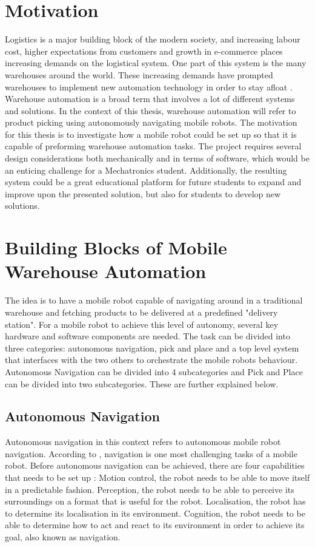 \section{Motivation}
Logistics is a major building block of the modern society, and increasing labour cost, higher expectations from customers and growth in e-commerce places increasing demands on the logistical system. One part of this system is the many warehouses around the world. These increasing demands have prompted warehouses to implement new automation technology in order to stay afloat \cite{CaiKai2020Wabl}. Warehouse automation is a broad term that involves a lot of different systems and solutions. In the context of this thesis, warehouse automation will refer to product picking using autonomously navigating mobile robots. The motivation for this thesis is to investigate how a mobile robot could be set up so that it is capable of preforming warehouse automation tasks. The project requires several design considerations both mechanically and in terms of software, which would be an enticing challenge for a Mechatronics student. Additionally, the resulting system could be a great educational platform for future students to expand and improve upon the presented solution, but also for students to develop new solutions.

\section{Building Blocks of Mobile Warehouse Automation}
The idea is to have a mobile robot capable of navigating around in a traditional warehouse and fetching products to be delivered at a predefined "delivery station". For a mobile robot to achieve this level of autonomy, several key hardware and software components are needed. The task can be divided into three categories: autonomous navigation, pick and place and a top level system that interfaces with the two others to orchestrate the mobile robots behaviour. Autonomous Navigation can be divided into 4 subcategories and Pick and Place can be divided into two subcategories. These are further explained below.

\subsection{Autonomous Navigation}\label{sec:I:AutonomousNavigation}
Autonomous navigation in this context refers to autonomous mobile robot navigation. According to \cite{SiegwartRoland2011Itam}, navigation is one most challenging tasks of a mobile robot. Before autonomous navigation can be achieved, there are four capabilities that needs to be set up \cite{SiegwartRoland2011Itam}: Motion control, the robot needs to be able to move itself in a predictable fashion. Perception, the robot needs to be able to perceive its surroundings on a format that is useful for the robot. Localisation, the robot has to determine its localisation in its environment. Cognition, the robot needs to be able to determine how to act and react to its environment in order to achieve its goal, also known as navigation.

